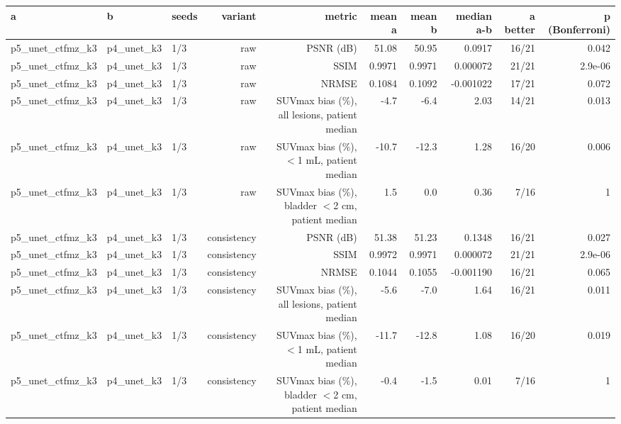 \begin{tabular}{lllrrrrrrr}
\toprule
a & b & seeds & variant & metric & mean a & mean b & median a-b & a better & p (Bonferroni) \\
\midrule
p5\_unet\_ctfmz\_k3 & p4\_unet\_k3 & 1/3 & raw & PSNR (dB) & 51.08 & 50.95 & 0.0917 & 16/21 & 0.042 \\
p5\_unet\_ctfmz\_k3 & p4\_unet\_k3 & 1/3 & raw & SSIM & 0.9971 & 0.9971 & 0.000072 & 21/21 & 2.9e-06 \\
p5\_unet\_ctfmz\_k3 & p4\_unet\_k3 & 1/3 & raw & NRMSE & 0.1084 & 0.1092 & -0.001022 & 17/21 & 0.072 \\
p5\_unet\_ctfmz\_k3 & p4\_unet\_k3 & 1/3 & raw & SUVmax bias (\%), all lesions, patient median & -4.7 & -6.4 & 2.03 & 14/21 & 0.013 \\
p5\_unet\_ctfmz\_k3 & p4\_unet\_k3 & 1/3 & raw & SUVmax bias (\%), $<$1 mL, patient median & -10.7 & -12.3 & 1.28 & 16/20 & 0.006 \\
p5\_unet\_ctfmz\_k3 & p4\_unet\_k3 & 1/3 & raw & SUVmax bias (\%), bladder $<$2 cm, patient median & 1.5 & 0.0 & 0.36 & 7/16 & 1 \\
p5\_unet\_ctfmz\_k3 & p4\_unet\_k3 & 1/3 & consistency & PSNR (dB) & 51.38 & 51.23 & 0.1348 & 16/21 & 0.027 \\
p5\_unet\_ctfmz\_k3 & p4\_unet\_k3 & 1/3 & consistency & SSIM & 0.9972 & 0.9971 & 0.000072 & 21/21 & 2.9e-06 \\
p5\_unet\_ctfmz\_k3 & p4\_unet\_k3 & 1/3 & consistency & NRMSE & 0.1044 & 0.1055 & -0.001190 & 16/21 & 0.065 \\
p5\_unet\_ctfmz\_k3 & p4\_unet\_k3 & 1/3 & consistency & SUVmax bias (\%), all lesions, patient median & -5.6 & -7.0 & 1.64 & 16/21 & 0.011 \\
p5\_unet\_ctfmz\_k3 & p4\_unet\_k3 & 1/3 & consistency & SUVmax bias (\%), $<$1 mL, patient median & -11.7 & -12.8 & 1.08 & 16/20 & 0.019 \\
p5\_unet\_ctfmz\_k3 & p4\_unet\_k3 & 1/3 & consistency & SUVmax bias (\%), bladder $<$2 cm, patient median & -0.4 & -1.5 & 0.01 & 7/16 & 1 \\
\bottomrule
\end{tabular}
